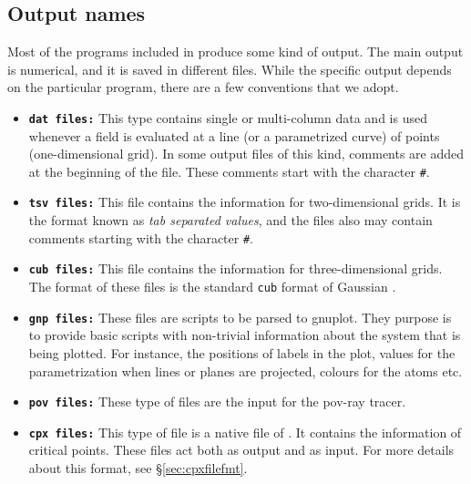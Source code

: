 \subsection{Output names}

Most of the programs included in \DTK{} produce some kind of output. The main output is numerical, and it is saved in different files. While the specific output depends on the particular program, there are a few conventions that we adopt. 

\begin{itemize}
   \item \texttt{\textbf{dat files:}} This type contains single or multi-column data and is used whenever a field is evaluated at a line (or a parametrized curve) of points (one-dimensional grid). In some output files of this kind, comments are added at the beginning of the file. These comments start with the character \texttt{\#}.
   \item \texttt{\textbf{tsv files:}} This file contains the information for two-dimensional grids. It is the format known as \textit{tab separated values}, and the files also may contain comments starting with the character \texttt{\#}.
   \item \texttt{\textbf{cub files:}} This file contains the information for three-dimensional grids. The format of these files is the standard \texttt{cub} format of Gaussian \cite{bib:gaussian09}.
   \item \texttt{\textbf{gnp files:}} These files are scripts to be parsed to gnuplot. They purpose is to provide basic scripts with non-trivial information about the system that is being plotted. For instance, the positions of labels in the plot, values for the parametrization when lines or planes are projected, colours for the atoms etc.
   \item \texttt{\textbf{pov files:}} These type of files are the input for the pov-ray tracer.
   \item \texttt{\textbf{cpx files:}} This type of file is a native file of \DTK. It contains the information of critical points. These files act both as output and as input. For more details about this format, see \S\ref{sec:cpxfilefmt}.
\end{itemize}

